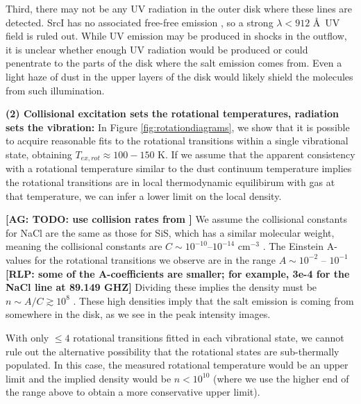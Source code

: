 \documentclass[twocolumn]{aastex62}
\newcommand{\sourcei}{SrcI\xspace}
\newcommand{\rlp}[1]{\textcolor{blue!65!black}{\textbf{[RLP: #1]}}}
\newcommand{\ag}[1]{\textcolor{red!65!black}{\textbf{[AG: #1]}}}
\begin{document}
Third, there may not be any UV radiation in the outer disk where these lines
are detected.  \sourcei has no associated free-free emission
\citep{Plambeck2013a}, so a strong $\lambda<912$ \AA\ UV field is ruled out.  While UV
emission may be produced in shocks in the outflow, it is unclear whether enough
UV radiation would be produced or could penentrate to the parts of the disk where
the salt emission comes from.  Even a light haze of dust in the upper layers of
the disk would likely shield the molecules from such illumination.

\par{\textbf{(2) Collisional excitation sets the rotational temperatures, radiation
sets the vibration:}}
In Figure \ref{fig:rotationdiagrams}, we show that it is possible to acquire
reasonable fits to the rotational transitions within a single vibrational state,
obtaining $T_{ex,rot}\approx100-150$ K.  If we assume that the apparent consistency
with a rotational temperature similar to the dust continuum temperature implies
the rotational transitions are in local thermodynamic equilibirum with gas at 
that temperature, we can infer a lower limit on the local density.

\ag{TODO: use collision rates from \citet{Quintana-Lacaci2016a}}
We assume the collisional constants for NaCl are the same as those for SiS,
which has a similar molecular weight, meaning the collisional constants are
$C\sim10^{-10}$--$10^{-14}$ cm$^{-3}$ \pers \citep{Dayou2006a}. 
The Einstein A-values for the rotational transitions we observe are in the
range $A\sim10^{-2}$ -- $10^{-1}$ \pers \rlp{some of the A-coefficients are smaller;
for example, 3e-4 for the NaCl line at 89.149 GHZ}
Dividing these implies the density must be $n\sim A/C \gtrsim10^8$ \percc.
These high densities imply that the salt emission is coming from
somewhere in the disk, as we see in the peak intensity images. 

With only $\leq4$ rotational transitions fitted in each vibrational
state, we cannot rule out the alternative possibility that the rotational
states are sub-thermally populated.  In this case, the measured rotational
temperature would be an upper limit and the implied density would be
$n<10^{10}$ \percc (where we use the higher end of the range above to obtain a
more conservative upper limit). 
\end{document}
